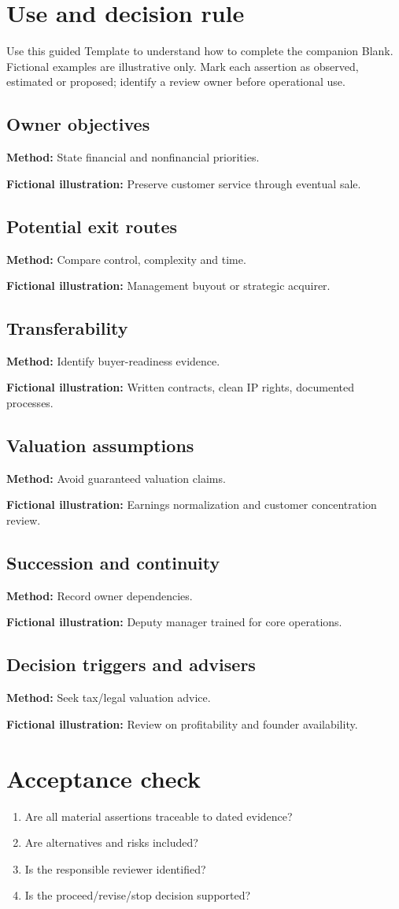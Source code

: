 \documentclass[11pt]{article}
\begin{document}
\SuiteOpen
\section{Use and decision rule}
Use this guided Template to understand how to complete the companion Blank. Fictional examples are illustrative only. Mark each assertion as observed, estimated or proposed; identify a review owner before operational use.
\subsection*{Owner objectives}
\textbf{Method:} State financial and nonfinancial priorities.\par\textbf{Fictional illustration:} Preserve customer service through eventual sale.\par
\subsection*{Potential exit routes}
\textbf{Method:} Compare control, complexity and time.\par\textbf{Fictional illustration:} Management buyout or strategic acquirer.\par
\subsection*{Transferability}
\textbf{Method:} Identify buyer-readiness evidence.\par\textbf{Fictional illustration:} Written contracts, clean IP rights, documented processes.\par
\subsection*{Valuation assumptions}
\textbf{Method:} Avoid guaranteed valuation claims.\par\textbf{Fictional illustration:} Earnings normalization and customer concentration review.\par
\subsection*{Succession and continuity}
\textbf{Method:} Record owner dependencies.\par\textbf{Fictional illustration:} Deputy manager trained for core operations.\par
\subsection*{Decision triggers and advisers}
\textbf{Method:} Seek tax/legal valuation advice.\par\textbf{Fictional illustration:} Review on profitability and founder availability.\par
\section{Acceptance check}
\begin{enumerate}[leftmargin=*,itemsep=5pt]
\item Are all material assertions traceable to dated evidence?
\item Are alternatives and risks included?
\item Is the responsible reviewer identified?
\item Is the proceed/revise/stop decision supported?
\end{enumerate}
\end{document}
